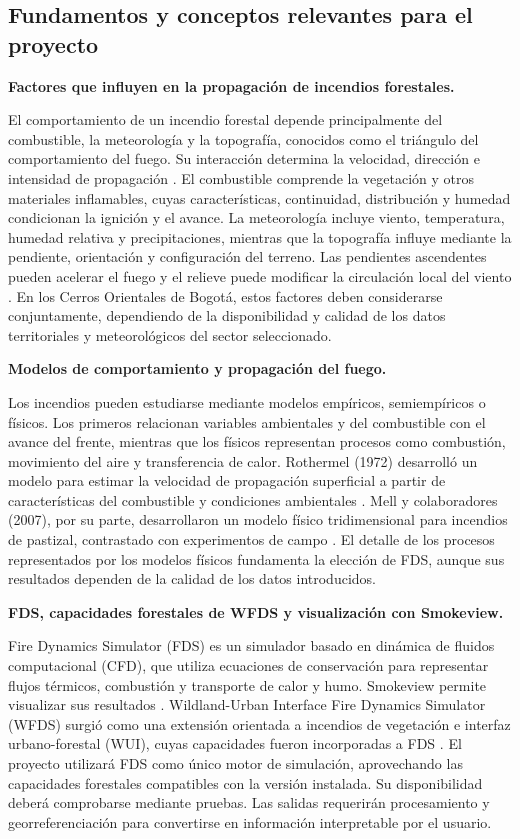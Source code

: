 \subsection{Fundamentos y conceptos relevantes para el proyecto}
\label{sec:fundamentos}

\textbf{Factores que influyen en la propagación de incendios forestales.}

El comportamiento de un incendio forestal depende principalmente del combustible, la meteorología y la topografía, conocidos como el triángulo del comportamiento del fuego. Su interacción determina la velocidad, dirección e intensidad de propagación \cite{vfpNPSFireBehavior}. El combustible comprende la vegetación y otros materiales inflamables, cuyas características, continuidad, distribución y humedad condicionan la ignición y el avance. La meteorología incluye viento, temperatura, humedad relativa y precipitaciones, mientras que la topografía influye mediante la pendiente, orientación y configuración del terreno. Las pendientes ascendentes pueden acelerar el fuego y el relieve puede modificar la circulación local del viento \cite{vfpNPSFireBehavior}. En los Cerros Orientales de Bogotá, estos factores deben considerarse conjuntamente, dependiendo de la disponibilidad y calidad de los datos territoriales y meteorológicos del sector seleccionado.

\textbf{Modelos de comportamiento y propagación del fuego.}

Los incendios pueden estudiarse mediante modelos empíricos, semiempíricos o físicos. Los primeros relacionan variables ambientales y del combustible con el avance del frente, mientras que los físicos representan procesos como combustión, movimiento del aire y transferencia de calor. Rothermel (1972) desarrolló un modelo para estimar la velocidad de propagación superficial a partir de características del combustible y condiciones ambientales \cite{vfpRothermel1972}. Mell y colaboradores (2007), por su parte, desarrollaron un modelo físico tridimensional para incendios de pastizal, contrastado con experimentos de campo \cite{mell2007}. El detalle de los procesos representados por los modelos físicos fundamenta la elección de FDS, aunque sus resultados dependen de la calidad de los datos introducidos.

\textbf{FDS, capacidades forestales de WFDS y visualización con Smokeview.}

Fire Dynamics Simulator (FDS) es un simulador basado en dinámica de fluidos computacional (CFD), que utiliza ecuaciones de conservación para representar flujos térmicos, combustión y transporte de calor y humo. Smokeview permite visualizar sus resultados \cite{fdsnist}. Wildland-Urban Interface Fire Dynamics Simulator (WFDS) surgió como una extensión orientada a incendios de vegetación e interfaz urbano-forestal (WUI), cuyas capacidades fueron incorporadas a FDS \cite{wfdsusfs}. El proyecto utilizará FDS como único motor de simulación, aprovechando las capacidades forestales compatibles con la versión instalada. Su disponibilidad deberá comprobarse mediante pruebas. Las salidas requerirán procesamiento y georreferenciación para convertirse en información interpretable por el usuario.


